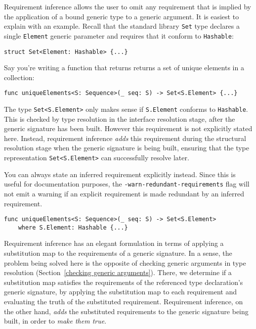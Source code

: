 \documentclass[../generics]{subfiles}
\begin{document}
Requirement inference allows the user to omit any requirement that is implied by the application of a bound generic type to a generic argument. It is easiest to explain with an example. Recall that the standard library \texttt{Set} type declares a single \texttt{Element} generic parameter and requires that it conform to \texttt{Hashable}:
\begin{Verbatim}
struct Set<Element: Hashable> {...}
\end{Verbatim}
Say you're writing a function that returns returns a set of unique elements in a collection:
\begin{Verbatim}
func uniqueElements<S: Sequence>(_ seq: S) -> Set<S.Element> {...}
\end{Verbatim}
The type \verb|Set<S.Element>| only makes sense if \texttt{S.Element} conforms to \texttt{Hashable}. This is checked by type resolution in the interface resolution stage, after the generic signature has been built. However this requirement is not explicitly stated here. Instead, requirement inference \emph{adds} this requirement during the structural resolution stage when the generic signature is being built, ensuring that the type representation \verb|Set<S.Element>| can successfully resolve later.

You can always state an inferred requirement explicitly instead. Since this is useful for documentation purposes, the \verb|-warn-redundant-requirements| flag will not emit a warning if an explicit requirement is made redundant by an inferred requirement.
\begin{Verbatim}
func uniqueElements<S: Sequence>(_ seq: S) -> Set<S.Element>
    where S.Element: Hashable {...}
\end{Verbatim}

Requirement inference has an elegant formulation in terms of applying a substitution map to the requirements of a generic signature. In a sense, the problem being solved here is the opposite of checking generic arguments in type resolution (Section~\ref{checking generic arguments}). There, we determine if a substitution map satisfies the requirements of the referenced type declaration's generic signature, by applying the substitution map to each requirement and evaluating the truth of the substituted requirement. Requirement inference, on the other hand, \emph{adds} the substituted requirements to the generic signature being built, in order to \emph{make them true}.
\end{document}
